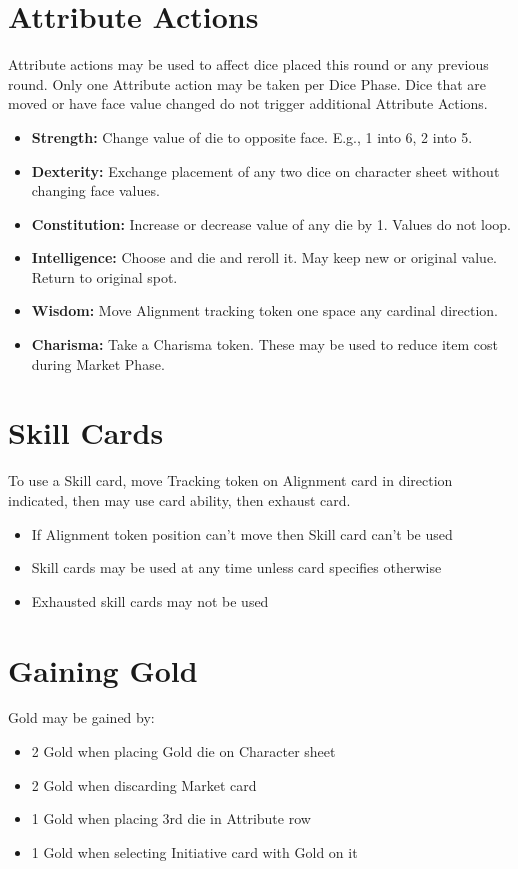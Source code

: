 \documentclass[12pt]{article}
\newenvironment{enumerateCustom}
{\begin{enumerate}
  \setlength{\itemsep}{1pt}
  \setlength{\parskip}{0pt}
  \setlength{\parsep}{0pt}}
{\end{enumerate}}
\newenvironment{itemizeCustom}
{\begin{itemize}
  \setlength{\itemsep}{1pt}
  \setlength{\parskip}{0pt}
  \setlength{\parsep}{0pt}}
{\end{itemize}}
\begin{document}
\begin{multicols*}{2}
\begin{enumerateCustom}
    \end{enumerateCustom}

\section*{Attribute Actions}
Attribute actions may be used to affect dice placed this round or any previous round. Only one Attribute action may be taken per Dice Phase. Dice that are moved or have face value changed do not trigger additional Attribute Actions.
    \begin{itemizeCustom}
        \item \textbf{Strength:} Change value of die to opposite face. E.g., 1 into 6, 2 into 5.
        \item \textbf{Dexterity:} Exchange placement of any two dice on character sheet without changing face values.
        \item \textbf{Constitution:} Increase or decrease value of any die by 1. Values do not loop.
        \item \textbf{Intelligence:} Choose and die and reroll it. May keep new or original value. Return to original spot.
        \item \textbf{Wisdom:} Move Alignment tracking token one space any cardinal direction.
        \item \textbf{Charisma:} Take a Charisma token. These may be used to reduce item cost during Market Phase.
    \end{itemizeCustom}

\section*{Skill Cards}
To use a Skill card, move Tracking token on Alignment card in direction indicated, then may use card ability, then exhaust card.
\begin{itemizeCustom}
    \item If Alignment token position can't move then Skill card can't be used
    \item Skill cards may be used at any time unless card specifies otherwise
    \item Exhausted skill cards may not be used
\end{itemizeCustom}

\section*{Gaining Gold}
Gold may be gained by:
\begin{itemizeCustom}
    \item 2 Gold when placing Gold die on Character sheet
    \item 2 Gold when discarding Market card
    \item 1 Gold when placing 3rd die in Attribute row
    \item 1 Gold when selecting Initiative card with Gold on it
\end{itemizeCustom}


\end{multicols*}
\end{document}
